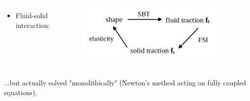 \documentclass{beamer}
\newcommand{\bi}{\begin{itemize}}
\newcommand{\ei}{\end{itemize}}
\begin{document}
\begin{frame}
\begin{overlayarea}{\textwidth}{\textheight}
\vspace{0.2cm}
		\begin{columns}
				\vspace{-0.6cm} 
			\bi
			\item Fluid-solid interaction: 
			\ei
			 \vspace{-0.35cm}
			\begin{figure}[htb]
				\begin{center}
					\includegraphics[width=0.9\textwidth]{plots/schematic/logic.png}
				\end{center}
			\end{figure}
		\end{columns}\vspace{0.1cm}
	...but actually solved "monolithically" (Newton's method acting on fully coupled equations).
	\end{overlayarea}
\end{frame}

\end{document}
